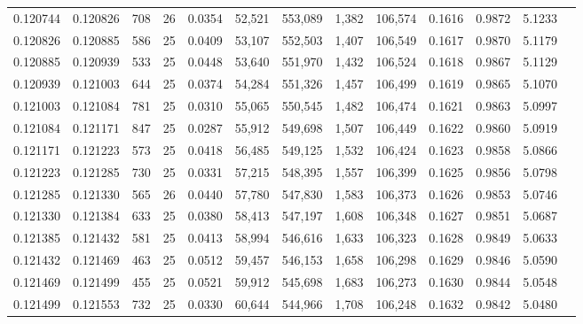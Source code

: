 \begin{tabular}{rrrrrrrrrrrrr}
0.120744 & 0.120826 &   708 &  26 &                                     0.0354 &  52,521 & 553,089 &   1,382 & 106,574 & 0.1616 & 0.9872 & 5.1233 \\
0.120826 & 0.120885 &   586 &  25 &                                     0.0409 &  53,107 & 552,503 &   1,407 & 106,549 & 0.1617 & 0.9870 & 5.1179 \\
0.120885 & 0.120939 &   533 &  25 &                                     0.0448 &  53,640 & 551,970 &   1,432 & 106,524 & 0.1618 & 0.9867 & 5.1129 \\
0.120939 & 0.121003 &   644 &  25 &                                     0.0374 &  54,284 & 551,326 &   1,457 & 106,499 & 0.1619 & 0.9865 & 5.1070 \\
0.121003 & 0.121084 &   781 &  25 &                                     0.0310 &  55,065 & 550,545 &   1,482 & 106,474 & 0.1621 & 0.9863 & 5.0997 \\
0.121084 & 0.121171 &   847 &  25 &                                     0.0287 &  55,912 & 549,698 &   1,507 & 106,449 & 0.1622 & 0.9860 & 5.0919 \\
0.121171 & 0.121223 &   573 &  25 &                                     0.0418 &  56,485 & 549,125 &   1,532 & 106,424 & 0.1623 & 0.9858 & 5.0866 \\
0.121223 & 0.121285 &   730 &  25 &                                     0.0331 &  57,215 & 548,395 &   1,557 & 106,399 & 0.1625 & 0.9856 & 5.0798 \\
0.121285 & 0.121330 &   565 &  26 &                                     0.0440 &  57,780 & 547,830 &   1,583 & 106,373 & 0.1626 & 0.9853 & 5.0746 \\
0.121330 & 0.121384 &   633 &  25 &                                     0.0380 &  58,413 & 547,197 &   1,608 & 106,348 & 0.1627 & 0.9851 & 5.0687 \\
0.121385 & 0.121432 &   581 &  25 &                                     0.0413 &  58,994 & 546,616 &   1,633 & 106,323 & 0.1628 & 0.9849 & 5.0633 \\
0.121432 & 0.121469 &   463 &  25 &                                     0.0512 &  59,457 & 546,153 &   1,658 & 106,298 & 0.1629 & 0.9846 & 5.0590 \\
0.121469 & 0.121499 &   455 &  25 &                                     0.0521 &  59,912 & 545,698 &   1,683 & 106,273 & 0.1630 & 0.9844 & 5.0548 \\
0.121499 & 0.121553 &   732 &  25 &                                     0.0330 &  60,644 & 544,966 &   1,708 & 106,248 & 0.1632 & 0.9842 & 5.0480 \\

\end{tabular}
